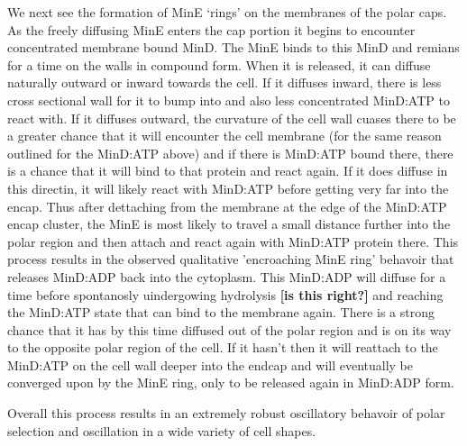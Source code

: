 \documentclass[letterpaper,twocolumn,amsmath,amssymb,pre]{revtex4-1}
\newcommand{\red}[1]{{\bf \color{red} #1}}
\newcommand{\fixme}[1]{\red{[#1]}}
\begin{document}
We next see the formation of MinE `rings' on the membranes of the
polar caps.  As the freely diffusing MinE enters the cap portion it
begins to encounter concentrated membrane bound MinD.  The MinE binds
to this MinD and remians for a time on the walls in compound form.
When it is released, it can diffuse naturally outward or inward
towards the cell.  If it diffuses inward, there is less cross
sectional wall for it to bump into and also less concentrated MinD:ATP
to react with.  If it diffuses outward, the curvature of the cell wall
cuases there to be a greater chance that it will encounter the cell
membrane (for the same reason outlined for the MinD:ATP above) and if
there is MinD:ATP bound there, there is a chance that it will bind to
that protein and react again.  If it does diffuse in this directin, it
will likely react with MinD:ATP before getting very far into the
encap.  Thus after dettaching from the membrane at the edge of the
MinD:ATP encap cluster, the MinE is most likely to travel a small
distance further into the polar region and then attach and react again
with MinD:ATP protein there.  This process results in the observed
qualitative 'encroaching MinE ring' behavoir that releases MinD:ADP
back into the cytoplasm.  This MinD:ADP will diffuse for a time before
spontanosly uindergowing hydrolysis \fixme{is this right?} and
reaching the MinD:ATP state that can bind to the membrane again.
There is a strong chance that it has by this time diffused out of the
polar region and is on its way to the opposite polar region of the
cell.  If it hasn't then it will reattach to the MinD:ATP on the cell
wall deeper into the endcap and will eventually be converged upon by
the MinE ring, only to be released again in MinD:ADP form.

Overall this process results in an extremely robust oscillatory
behavoir of polar selection and oscillation in a wide variety of cell
shapes.
\end{document}
